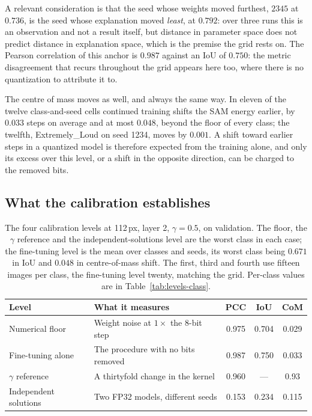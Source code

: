 A relevant consideration is that the seed whose weights moved furthest, $2345$ at
$0.736$, is the seed whose explanation moved \emph{least}, at $0.792$: over three
runs this is an observation and not a result itself, but distance in parameter space
does not predict distance in explanation space, which is the premise the grid
rests on. The Pearson correlation of this anchor is $0.987$ against an IoU of
$0.750$: the metric disagreement that recurs throughout the grid appears here
too, where there is no quantization to attribute it to.

The centre of mass moves as well, and always the same way. In eleven of the
twelve class-and-seed cells continued training shifts the SAM energy earlier, by
$0.033$ steps on average and at most $0.048$, beyond the floor of every class;
the twelfth, Extremely\_Loud on seed 1234, moves by $0.001$. A shift toward
earlier steps in a quantized model is therefore expected from the training alone,
and only its excess over this level, or a shift in the opposite direction, can be
charged to the removed bits.

\subsection{What the calibration establishes}

\begin{table}[htbp]
\centering
\begin{tabular}{llccc}
\toprule
Level & What it measures & PCC & IoU & CoM \\
\midrule
Numerical floor & Weight noise at $1\times$ the 8-bit step & 0.975 & 0.704 & 0.029 \\
Fine-tuning alone & The procedure with no bits removed & 0.987 & 0.750 & 0.033 \\
$\gamma$ reference & A thirtyfold change in the kernel & 0.960 & --- & 0.93 \\
Independent solutions & Two FP32 models, different seeds & 0.153 & 0.234 & 0.115 \\
\bottomrule
\end{tabular}
\caption{The four calibration levels at 112\,px, layer 2, $\gamma = 0.5$, on
validation. The floor, the $\gamma$ reference and the independent-solutions level
are the worst class in each case; the fine-tuning level is the mean over classes
and seeds, its worst class being $0.671$ in IoU and $0.048$ in centre-of-mass
shift. The first, third and fourth use fifteen images per class, the fine-tuning
level twenty, matching the grid. Per-class values are in
Table~\ref{tab:levels-class}.}
\label{tab:calibration}
\end{table}

